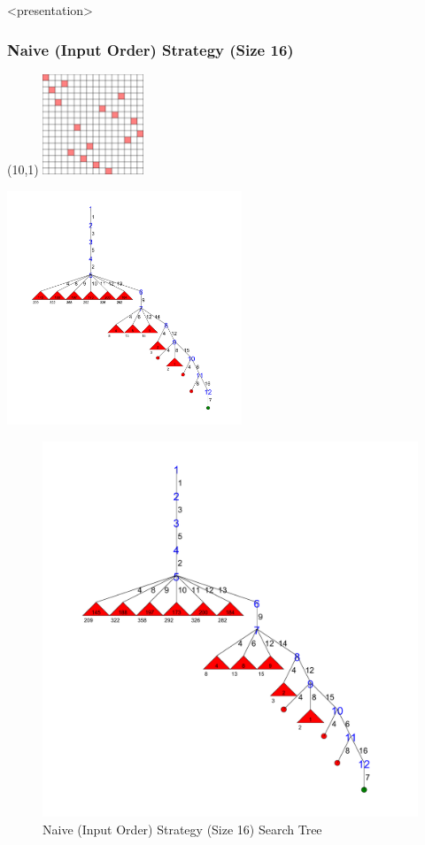 \begin{frame}<presentation>
\frametitle{Naive (Input Order) Strategy (Size 16)}
\begin{textblock}{4}(10,1)
\includegraphics[width=3cm]{../nqueen/naive/frame2959}
\end{textblock}
\includegraphics[width=7cm]{../nqueen/naive/tree_compact}
\end{frame}

\begin{figure}[h]
\caption{\label{nqueen:naive16tree}Naive (Input Order) Strategy (Size 16) Search Tree}
\begin{center}
\includegraphics[width=12cm]{../nqueen/naive/tree_compact}
\end{center}
\end{figure}

